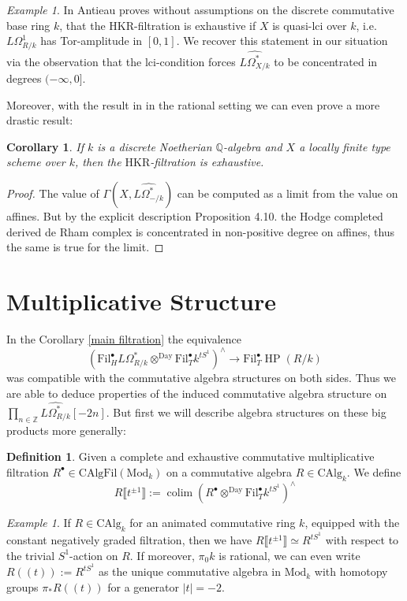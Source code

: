 \documentclass[10pt, reqno]{amsart}
\newtheorem{corollary}[theorem]{Corollary}
\theoremstyle{definition}
\newtheorem{definition}[theorem]{Definition}
\theoremstyle{remark}
\newtheorem{example}[theorem]{Example}
\newcommand{\Q}{\mathbb{Q}}
\newcommand{\Z}{\mathbb{Z}}
\newcommand{\CAlg}{\mathrm{CAlg}}
\newcommand{\dr}[3]{\Omega^{#3}_{#1/#2}}
\DeclareMathOperator{\colim}{\mathrm{colim}}
\newcommand{\Fil}{\mathrm{Fil}}
\newcommand{\llrrpar}[1]{(\!(#1)\!)}
\newcommand{\essLaur}{\llbracket t^{\pm1}\rrbracket}
\newcommand{\Mod}{\mathrm{Mod}}
\newcommand{\HKR}{\mathrm{HKR}}
\newcommand{\Day}{\mathrm{Day}}
\DeclareMathOperator{\HP}{\mathrm{HP}}
\begin{document}
\begin{example}
	In \cite{Ant19} Antieau proves without assumptions on the discrete commutative base ring $k$, that the $\HKR$-filtration is exhaustive if $X$ is quasi-lci over $k$, i.e. $L\dr Rk1$ has Tor-amplitude in $[0,1]$. We recover this statement in our situation via the observation that the lci-condition forces $\widehat{L\dr Xk*}$ to be concentrated in degrees $(-\infty,0]$. 
\end{example}
	
	Moreover, with the result in \cite{Bha12} in the rational setting we can even prove a more drastic result:

\begin{corollary}
	If $k$ is a discrete Noetherian $\Q$-algebra and $X$ a locally finite type scheme over $k$, then the $\HKR$-filtration is exhaustive.
\end{corollary}
\begin{proof}
	The value of $\Gamma(X,\widehat{L\dr -k*})$ can be computed as a limit from the value on affines. But by the explicit description \cite{Bha12} Proposition 4.10. the Hodge completed derived de Rham complex is concentrated in non-positive degree on affines, thus the same is true for the limit.
\end{proof}

\section{Multiplicative Structure}\label{mal}
	In the Corollary \ref{main filtration} the equivalence 
	\[\left(\Fil_H^\bullet L\dr Rk*\otimes^\Day\Fil_T^\bullet k^{tS^1}\right)^\wedge\to \Fil_T^\bullet\HP(R/k)\]
	was compatible with the commutative algebra structures on both sides. Thus we are able to deduce properties of the induced commutative algebra structure on $\prod_{n\in\Z}\widehat{L\dr Rk*}[-2n]$. But first we will describe algebra structures on these big products more generally:

\begin{definition}
	Given a complete and exhaustive commutative multiplicative filtration $R^\bullet\in\CAlg\Fil(\Mod_k)$ on a commutative algebra $R\in\CAlg_k$. We define 
	\[R\essLaur :=\colim\left(R^\bullet\otimes^\Day\Fil_T^\bullet k^{tS^1}\right)^\wedge\]
\end{definition}

\begin{example}\label{example}
	If $R\in\CAlg_k$ for an animated commutative ring $k$, equipped with the constant negatively graded filtration, then we have $R\essLaur\simeq R^{tS^1}$ with respect to the trivial $S^1$-action on $R$. If moreover, $\pi_0k$ is rational, we can even write $R\llrrpar t:= R^{tS^1}$ as the unique commutative algebra in $\Mod_k$ with homotopy groups $\pi_*R\llrrpar t$ for a generator $|t|=-2$.
\end{example}
\end{document}

